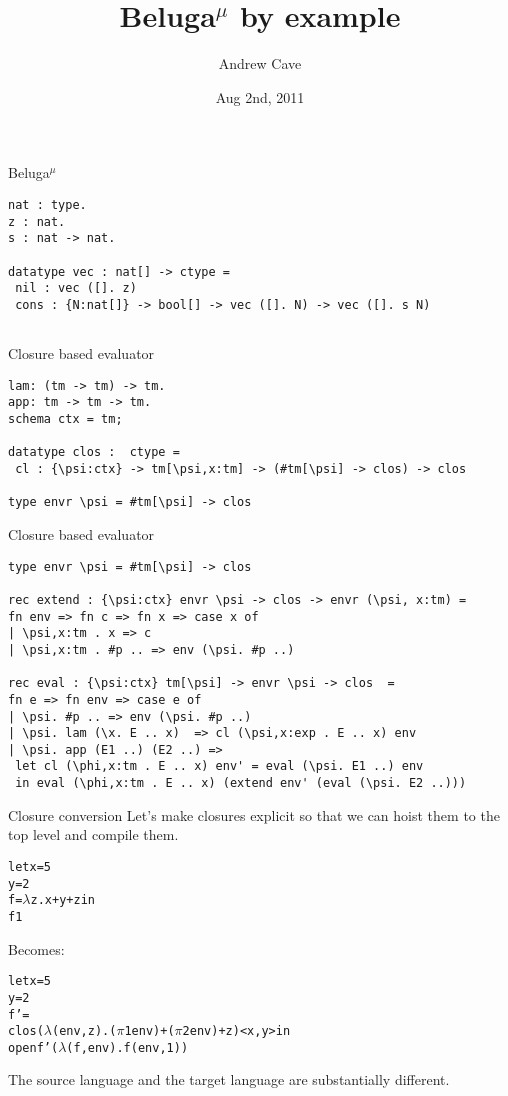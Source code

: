 \documentclass{beamer}
\title[]{Beluga$^\mu$ by example}
\author{Andrew Cave}
\date{Aug 2nd, 2011}
\begin{document}
\begin{frame}
\titlepage
\end{frame}

\begin{frame}[fragile]{Beluga$^\mu$}
\begin{lstlisting}
nat : type.
z : nat.
s : nat -> nat.

datatype vec : nat[] -> ctype =
 nil : vec ([]. z)
 cons : {N:nat[]} -> bool[] -> vec ([]. N) -> vec ([]. s N)
 
\end{lstlisting}
\end{frame}

\begin{frame}[fragile]{Closure based evaluator}
\begin{lstlisting}
lam: (tm -> tm) -> tm.              
app: tm -> tm -> tm.
schema ctx = tm;

datatype clos :  ctype =
 cl : {\psi:ctx} -> tm[\psi,x:tm] -> (#tm[\psi] -> clos) -> clos

type envr \psi = #tm[\psi] -> clos
\end{lstlisting}
\end{frame}

\begin{frame}[fragile]{Closure based evaluator}
\begin{lstlisting}
type envr \psi = #tm[\psi] -> clos

rec extend : {\psi:ctx} envr \psi -> clos -> envr (\psi, x:tm) =
fn env => fn c => fn x => case x of
| \psi,x:tm . x => c
| \psi,x:tm . #p .. => env (\psi. #p ..)

rec eval : {\psi:ctx} tm[\psi] -> envr \psi -> clos  =
fn e => fn env => case e of
| \psi. #p .. => env (\psi. #p ..)
| \psi. lam (\x. E .. x)  => cl (\psi,x:exp . E .. x) env
| \psi. app (E1 ..) (E2 ..) =>
 let cl (\phi,x:tm . E .. x) env' = eval (\psi. E1 ..) env
 in eval (\phi,x:tm . E .. x) (extend env' (eval (\psi. E2 ..)))
\end{lstlisting}
\end{frame}

\begin{frame}[fragile]{Closure conversion}
Let's make closures explicit so that we can hoist them to the top level and compile them.

\begin{alltt}
let x = 5
    y = 2
    f = \(\lambda\)z. x + y + z in
  f 1
\end{alltt}

Becomes:

\begin{alltt}
let x = 5
    y = 2
    f' =
 clos (\(\lambda\)(env,z). (\(\pi\) 1 env) + (\(\pi\) 2 env) + z) < x , y > in
 open f' (\(\lambda\)(f,env). f (env,1))
\end{alltt}

The source language and the target language are substantially different.
\end{frame}
\end{document}
